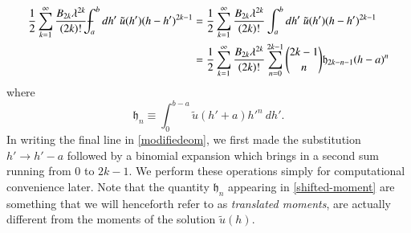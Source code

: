 \documentclass[3p,12pt]{elsarticle}
\numberwithin{equation}{section}
\begin{document}
\begin{equation}
\label{modifiedeom}
\begin{aligned}
\frac{1}{2}\sum_{k=1}^{\infty}\frac{B_{2k}\lambda^{2k}}{(2k)!}\Xint-_{a}^{b} dh'\ \tilde{u}(h')(h-h')^{2k-1}&=\frac{1}{2}\sum_{k=1}^{\infty}\frac{B_{2k}\lambda^{2k}}{(2k)!}\int_{a}^{b} dh'\ \tilde{u}(h')(h-h')^{2k-1}\\
&=\frac{1}{2}\sum_{k=1}^{\infty}\frac{B_{2k}\lambda^{2k}}{(2k)!}\sum_{n=0}^{2k-1} {2k-1 \choose n}\mathfrak{h}_{2k-n-1}(h-a)^n
\end{aligned}
\end{equation}
where 
\begin{equation}
\label{shifted-moment}
\mathfrak{h}_{n} \equiv \int_0^{b-a}\tilde{u}(h'+a)h'^n\ dh' .
\end{equation}
In writing the final line in \eqref{modifiedeom}, we first made the substitution $h' \rightarrow h'-a$ followed by a binomial expansion which brings in a second sum running from 0 to $2k-1$. We perform these operations simply for computational convenience later. Note that the quantity $\mathfrak{h}_n$ appearing in \eqref{shifted-moment} are something that we will henceforth refer to as \emph{translated moments}, are actually different from the moments of the solution $\tilde{u}(h)$.
\end{document}
